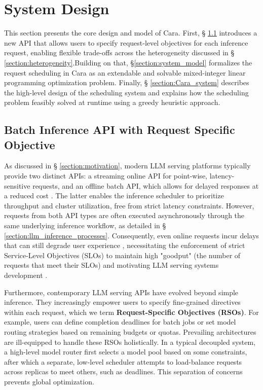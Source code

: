 \documentclass[letterpaper, anonymous, twocolumn, 10pt]{article}
\begin{document}
\section{System Design} \label{section:design}

This section presents the core design and model of Cara. First, § \ref{section:API} introduces a new API that allows users to specify request-level objectives for each inference request, enabling flexible trade-offs across the heterogeneity discussed in § \ref{section:heterogeneity}.Building on that, \S \ref{section:system_model} formalizes the request scheduling in Cara as an extendable and solvable mixed-integer linear programming optimization problem. Finally, § \ref{section:Cara_system} describes the high-level design of the scheduling system and explains how the scheduling problem feasibly solved at runtime using a greedy heuristic approach.

\subsection{Batch Inference API with Request Specific Objective} \label{section:API}

As discussed in § \ref{section:motivation}, modern LLM serving platforms typically provide two distinct APIs: a streaming online API for point-wise, latency-sensitive requests, and an offline batch API, which allows for delayed responses at a reduced cost \cite{googleBatchGemini, openaiOpenAIPlatform}. The latter enables the inference scheduler to prioritize throughput and cluster utilization, free from strict latency constraints. However, requests from both API types are often executed asynchronously through the same underlying inference workflow, as detailed in § \ref{section:llm_inference_processes}. Consequently, even online requests incur delays that can still degrade user experience \cite{wang2024revisitingslogoodputmetrics}, necessitating the enforcement of strict Service-Level Objectives (SLOs) to maintain high "goodput" (the number of requests that meet their SLOs) and motivating LLM serving systems development \cite{liu2025turbospecclosedloopspeculationcontrol, zhong2024distservedisaggregatingprefilldecoding, wang2025prefilldecodeaggregationdisaggregationunifying} .

Furthermore, contemporary LLM serving APIs have evolved beyond simple inference. They increasingly empower users to specify fine-grained directives within each request, which we term \textbf{Request-Specific Objectives (RSOs)}. For example, users can define completion deadlines for batch jobs or set model routing strategies \cite{openaiIntroducingGPT5, microsoftModelRouter} based on remaining budgets or quotas. Prevailing architectures are ill-equipped to handle these RSOs holistically. In a typical decoupled system, a high-level model router first selects a model pool based on some constraints, after which a separate, low-level scheduler attempts to load-balance requests across replicas to meet others, such as deadlines. This separation of concerns prevents global optimization.
\end{document}
